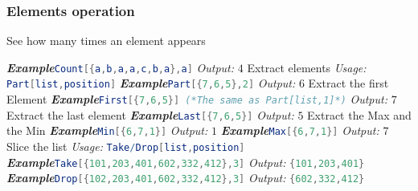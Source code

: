 \documentclass[a4paper]{book}
\begin{document}
\subsubsection{Elements operation}
\noindent See how many times an element appears

\noindent\emph{\textbf{Example}}\quad \lstinline[language=Mathematica]|Count[{a,b,a,a,c,b,a},a]| \hspace{\fill}\emph{Output:} $4$
\newline
\newline
\noindent Extract elements
\newline
\noindent \emph{Usage:} \lstinline[language=Mathematica]|Part[list,position]| 
\newline
\noindent\emph{\textbf{Example}}\quad \lstinline[language=Mathematica]|Part[{7,6,5},2]| \hspace{\fill}\emph{Output:} $6$
\newline
\newline
\noindent Extract the first Element
\newline
\noindent\emph{\textbf{Example}}\quad \lstinline[language=Mathematica]|First[{7,6,5}] (*The same as Part[list,1]*)| \hspace{\fill}\emph{Output:} $7$
\newline
\newline
\noindent Extract the last element
\newline
\noindent\emph{\textbf{Example}}\quad \lstinline[language=Mathematica]|Last[{7,6,5}]| \hspace{\fill}\emph{Output:} $5$
\newline
\newline
\noindent Extract the Max and the Min
\newline
\noindent\emph{\textbf{Example}}\quad \lstinline[language=Mathematica]|Min[{6,7,1}]| \hspace{\fill}\emph{Output:} $1$
\newline
\noindent\emph{\textbf{Example}}\quad \lstinline[language=Mathematica]|Max[{6,7,1}]| \hspace{\fill}\emph{Output:} $7$
\newline
\newline
\noindent Slice the list
\newline
\noindent \emph{Usage:} \lstinline[language=Mathematica]|Take/Drop[list,position]| 
\newline
\noindent\emph{\textbf{Example}}\quad \lstinline[language=Mathematica]|Take[{101,203,401,602,332,412},3]| \hspace{\fill}\emph{Output:} \lstinline[language=Mathematica]|{101,203,401}|
\newline
\noindent\emph{\textbf{Example}}\quad \lstinline[language=Mathematica]|Drop[{102,203,401,602,332,412},3]| \hspace{\fill}\emph{Output:} \lstinline[language=Mathematica]|{602,332,412}| 
\end{document}
